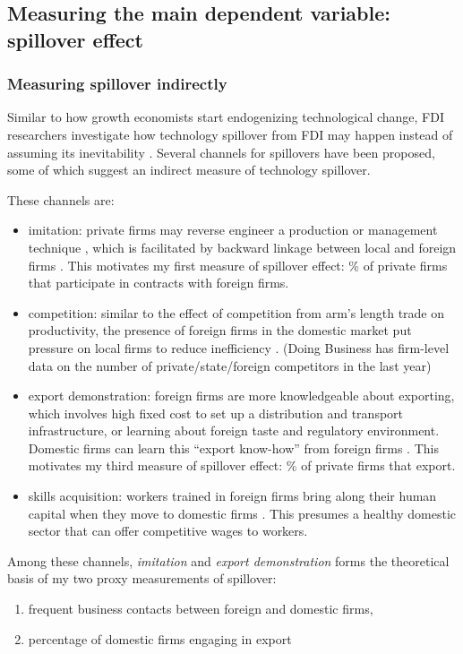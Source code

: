 
\subsection{Measuring the main dependent variable: spillover effect}

\subsubsection*{Measuring spillover indirectly}

Similar to how growth economists start endogenizing technological change, FDI researchers investigate how technology spillover from FDI may happen instead of assuming its inevitability \citep{Romer1994}. Several channels for spillovers have been proposed, some of which suggest an indirect measure of technology spillover.

These channels are:
\begin{itemize}
	\item imitation:  private firms may reverse engineer a production or management technique \citep{Wang1992}, which is facilitated by backward linkage between local and foreign firms \citep{Javorcik2004}. This motivates my first measure of spillover effect: \% of private firms that participate in contracts with foreign firms.
	\item competition: similar to the effect of competition from arm's length trade on productivity, the presence of foreign firms in the domestic market put pressure on local firms to reduce inefficiency \citep{Glass2002}. (Doing Business has firm-level data on the number of private/state/foreign competitors in the last year)
	\item export demonstration: foreign firms are more knowledgeable about exporting, which involves high fixed cost to set up a distribution and transport infrastructure, or learning about foreign taste and regulatory environment. Domestic firms can learn this ``export know-how'' from foreign firms \citep{Aitken1997}. This motivates my third measure of spillover effect: \% of private firms that export.
	\item skills acquisition: workers trained in foreign firms bring along their human capital when they move to domestic firms \citep{Djankov2000}. This presumes a healthy domestic sector that can offer competitive wages to workers.
\end{itemize}

Among these channels, \textit{imitation} and \textit{export demonstration} forms the theoretical basis of my two proxy measurements of spillover:
\begin{enumerate}
\item frequent business contacts between foreign and domestic firms,
\item percentage of domestic firms engaging in export
\end{enumerate}

